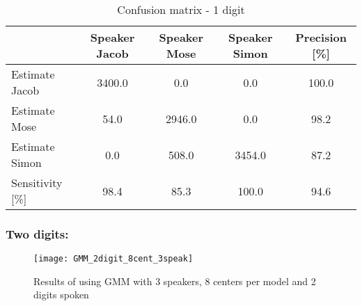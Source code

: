 \begin{table}[H]                                                   
\centering                                                          
\begin{tabular}{|l|c|c|c|c|}                                        
\hline                                                              
  & Speaker Jacob & Speaker Mose & Speaker Simon & Precision [\%] \\
\hline                                                              
Estimate Jacob & 3400.0 & 0.0 & 0.0 & 100.0 \\                      
\hline                                                              
Estimate Mose & 54.0 & 2946.0 & 0.0 & 98.2 \\                       
\hline                                                              
Estimate Simon & 0.0 & 508.0 & 3454.0 & 87.2 \\                     
\hline                                                              
Sensitivity [\%] & 98.4 & 85.3 & 100.0 & 94.6 \\                    
\hline                                                              
\end{tabular}                                                       
\caption{Confusion matrix - 1 digit}                                
\label{table:GMM_conf_1}                                            
\end{table} 


\subsubsection{Two digits:}
\begin{figure}[H]
\centering
\texttt{[image: GMM\_2digit\_8cent\_3speak]}
\caption{Results of using GMM with 3 speakers, 8 centers per model and 2 digits spoken}
\label{fig:GMM_fig_2}
\end{figure}

